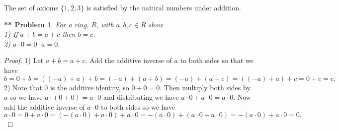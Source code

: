 \documentclass{article}
\newtheorem{**}{** Problem}
\begin{document}
\begin{flushleft}
The set of axioms $\{1, \overline{2}, 3\}$ is satisfied by the natural numbers under addition.

\begin{**}
For a ring, $R$, with $a,b,c \in R$ show\\
1) If $a+b = a+c$ then $b=c$.\\
2) $a \cdot 0 = 0 \cdot a = 0$.
\end{**}
\begin{proof}
1) Let $a+b = a+c$. Add the additive inverse of $a$ to both sides so that we have
\[
b = 0+b = ((-a) + a) + b = (-a) + (a + b) = (-a) + (a+c) = ((-a) + a) + c = 0+c = c.
\]
2) Note that $0$ is the additive identity, so $0 + 0 = 0$. Then multiply both sides by $a$ so we have $a \cdot (0 + 0) = a \cdot 0$ and distributing we have $a \cdot 0 + a \cdot 0 = a \cdot 0$. Now add the additive inverse of $a \cdot 0$ to both sides so we have
\[
a \cdot 0 = 0 + a \cdot 0 = (-(a \cdot 0) + a \cdot 0) + a \cdot 0 = -(a \cdot 0) + (a \cdot 0 + a \cdot 0) = -(a \cdot 0) + a \cdot 0 = 0.
\]
\end{proof}


\end{flushleft}
\end{document}
